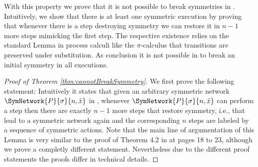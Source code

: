 \documentclass[11pt,techReport]{eptcs}
\begin{document}
With this property we prove that it is not possible to break symmetries in \pisep.  Intuitively, we show that there is at least one symmetric execution by proving that whenever there is a step destroying symmetry we can restore it in $ n {-} 1 $ more steps mimicking the first step. The respective existence relies on the standard Lemma in process calculi like the $\pi$-calculus that transitions are preserved under substitution.  As conclusion it is not possible in \pisep to break an initial symmetry in all executions.



\begin{proof}[Proof of Theorem \ref{thm:cannotBreakSymmetry}]
	We first prove the following statement:
	Intuitively it states that given an arbitrary symmetric network $ \SymNetwork{P}{\sigma}{n, \tilde{x}} $ in \procsep, whenever $ \SymNetwork{P}{\sigma}{n, \tilde{x}} $ can perform a step then there are exactly $ n {-} 1 $ more steps that restore symmetry, i.e., that lead to a symmetric network again and the corresponding $ n $ steps are labeled by a sequence of symmetric actions. Note that the main line of argumentation of this Lemma is very similar to the proof of Theorem 4.2 in \cite{palamidessi03} at pages 18 to 23, although we prove a completly different statement. Nevertheless due to the different proof statements the proofs differ in technical details.


\end{proof}
\end{document}
